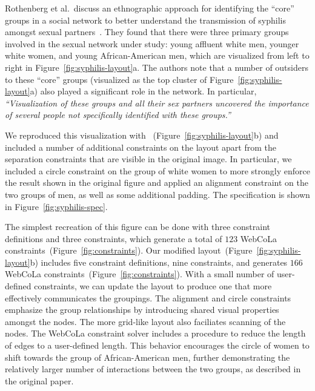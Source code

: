 Rothenberg et al.\ discuss an ethnographic approach for identifying the
``core'' groups in a social network to better understand the transmission
of syphilis amongst sexual partners~\cite{rothenberg1998using}. They found
that there were three primary groups involved in the sexual network under study:
young affluent white men, younger white women, and young African-American men,
which are visualized from left to right in Figure~\ref{fig:syphilis-layout}a. 
The authors note that a number of outsiders to these ``core'' groups
(visualized as the top cluster of Figure~\ref{fig:syphilis-layout}a) 
also played a significant role in the network. In
particular, \emph{``Visualization of these groups and all their sex
  partners uncovered the importance of several people not specifically
  identified with these groups.''}

We reproduced this visualization with \projectname~(Figure~\ref{fig:syphilis-layout}b) 
and included a number of additional constraints on the layout apart
from the separation constraints that are visible in the original image. In
particular, we included a circle constraint on the group of white
women to more strongly enforce the result shown in the original figure and
applied an alignment constraint on the two groups of
men, as well as some additional padding. The \projectname specification
is shown in Figure~\ref{fig:syphilis-spec}.

The simplest recreation of this figure can be done with three constraint
definitions and three \projectname constraints, which generate a total of
$123$ WebCoLa constraints~(Figure~\ref{fig:constraints}).
Our modified layout~(Figure~\ref{fig:syphilis-layout}b) includes 
five constraint definitions, nine \projectname constraints, and generates 
$166$ WebCoLa constraints~(Figure~\ref{fig:constraints}). With a small 
number of user-defined constraints, we can update the layout to produce
one that more effectively communicates the groupings. The
alignment and circle constraints emphasize the group relationships by
introducing shared visual properties amongst the nodes. The more grid-like
layout also faciliates scanning of the nodes. The
WebCoLa constraint solver includes a procedure to reduce the length of
edges to a user-defined length. This behavior encourages the circle of women
to shift towards the group of African-American men, further demonstrating
the relatively larger number of interactions between the two groups,
as described in the original paper.

